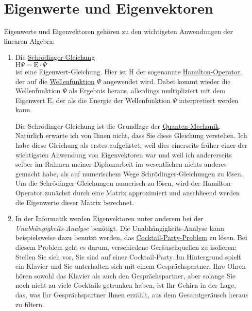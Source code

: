 \chapter{Eigenwerte und Eigenvektoren}
Eigenwerte und Eigenvektoren geh\"oren zu den wichtigsten Anwendungen der linearen Algebra:
\begin{enumerate}
\item Die \href{http://de.wikipedia.org/wiki/Schr\"odingergleichung}{Schr\"odinger-Gleichung}
      \\[0.2cm]
      \hspace*{1.3cm}
      $\mathrm{H} \Psi = \mathrm{E} \cdot \Psi$
      \\[0.2cm]
      ist eine Eigenwert-Gleichung.  Hier ist $\mathrm{H}$ der sogenannte
      \href{http://de.wikipedia.org/wiki/Hamilton-Operator}{Hamilton-Operator}, der auf die
      \href{http://de.wikipedia.org/wiki/Wellenfunktion}{Wellenfunktion} $\Psi$ angewendet wird.
      Dabei kommt wieder die Wellenfunktion $\Psi$ als Ergebnis heraus, allerdings multipliziert mit
      dem Eigenwert $\mathrm{E}$, der als die Energie der Wellenfunktion $\Psi$ interpretiert werden kann.

      Die Schr\"odinger-Gleichung ist die Grundlage der \href{http://de.wikipedia.org/wiki/Quantenmechanik}{Quanten-Mechanik}.
      Nat\"urlich erwarte ich von Ihnen nicht, dass Sie diese Gleichung verstehen.  Ich habe diese
      Gleichung als erstes aufgelistet, weil dies einerseits fr\"uher einer der wichtigsten Anwendung von
      Eigenvektoren war und weil ich andererseits selber im Rahmen meiner Diplomarbeit im
      wesentlichen nichts anderes gemacht habe, als auf numerischem Wege Schr\"odinger-Gleichungen zu
      l\"osen.  Um die Schr\"odinger-Gleichungen numerisch zu l\"osen, wird der Hamilton-Operator zun\"achst
      durch eine Matrix approximiert und anschlie\3end werden die Eigenwerte dieser Matrix berechnet.
\item In der Informatik werden Eigenvektoren unter anderem bei der 
      \emph{Unabh\"angigkeits-Analyse} ben\"otigt.  Die Unabh\"angigkeits-Analyse kann beispielsweise dazu
      benutzt werden, das
      \href{http://research.ics.aalto.fi/ica/cocktail/cocktail_en.cgi}{Cocktail-Party-Problem} zu l\"osen.
      Bei diesem Problem geht es darum, verschiedene Ger\"auschquellen zu isolieren:  Stellen
      Sie sich vor, Sie sind auf einer Cocktail-Party.  Im Hintergrund spielt ein Klavier und Sie
      unterhalten sich mit einem Gespr\"achspartner.  Ihre Ohren h\"oren sowohl das Klavier als auch den
      Gespr\"achspartner, aber solange Sie noch nicht zu viele Cocktails getrunken haben, ist Ihr
      Gehirn in der Lage, das, was Ihr Gespr\"achspartner Ihnen erz\"ahlt, aus 
      dem Gesamtger\"ausch heraus zu filtern.  


\end{enumerate}
